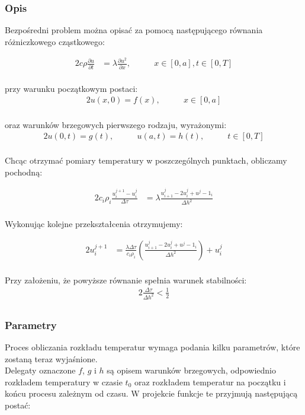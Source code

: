 \documentclass[twoside]{projektInzynierskiMS1}
\newcommand{\si}{ś}
\begin{document}
\subsubsection{Opis}

Bezpo\si redni problem można opisać za pomocą następującego równania różniczkowego cząstkowego:

\begin{alignat*}{2}
c\rho \frac{\partial u}{\partial t}&= \lambda \frac{\partial u^2}{\partial x},&\qquad  x \in [0, a], t \in [0, T]\\
\end{alignat*}

przy warunku początkowym postaci:
\begin{alignat*}{2}
u(x, 0) = f(x),&\qquad  x \in [0, a]\\
\end{alignat*}

oraz warunków brzegowych pierwszego rodzaju, wyrażonymi:
\begin{alignat*}{2}
u(0,t) = g(t),&\qquad  u(a, t) = h(t), &\qquad t \in [0, T]\\
\end{alignat*}

Chcąc otrzymać pomiary temperatury w poszczególnych punktach, obliczamy pochodną:

\begin{alignat*}{2}
c_i \rho _i \frac{ u^{j+1}_i - u^j_i}{ \Delta \tau}&= \lambda \frac{ u^j_{i+1} - 2u^j_i+u^j-1_i}{\Delta h^2}\\
\end{alignat*}

Wykonując kolejne przekształcenia otrzymujemy:

\begin{alignat*}{2}
 u^{j+1}_i&= \frac{\lambda \Delta \tau}{c_i \rho _i} \left( \frac{u^j_{i+1} - 2u^j_i+u^j-1_i}{\Delta h^2} \right) + u^j_i\\
\end{alignat*}

Przy założeniu, że powyższe równanie spełnia warunek stabilno\si ci:
\begin{alignat*}{2}
\frac{\Delta \tau}{\Delta h^2} < \frac{1}{2}\\
\end{alignat*}


\subsubsection{Parametry}
Proces obliczania rozkładu temperatur wymaga podania kilku parametrów, które zostaną teraz wyja\si nione. \\
Delegaty oznaczone $f$, $g$ i $h$ są opisem warunków brzegowych, odpowiednio rozkładem temperatury w czasie $t_0$ oraz rozkładem temperatur na początku i końcu procesu zależnym od czasu. W projekcie funkcje te przyjmują następującą postać:
\end{document}
